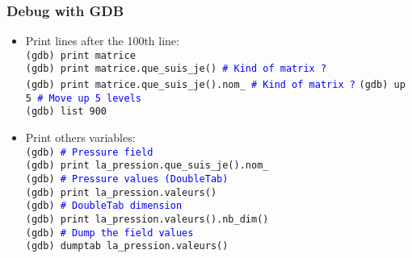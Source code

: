 \documentclass[10pt, hyperref={unicode=true,pdfusetitle, bookmarks=true,bookmarksnumbered=false,bookmarksopen=false, breaklinks=false,pdfborder={0 0 1},backref=true,colorlinks=true,linkcolor=darkblue,pageanchor, urlcolor=darkblue}]{beamer}
\begin{document}
\begin{frame}
\frametitle{Debug with GDB}
\begin{block}{}

\begin{itemize}
\item Print lines after the 100th line:\\
\texttt{(gdb) print matrice}\\
\texttt{(gdb) print matrice.que\_suis\_je() \textcolor{blue}{\# Kind of matrix ?}}\\
\texttt{(gdb) print matrice.que\_suis\_je().nom\_ \textcolor{blue}{\# Kind of matrix ?}}
\texttt{(gdb) up 5 \textcolor{blue}{\# Move up 5 levels}}\\
\texttt{(gdb) list 900}

\item Print others variables:\\
\texttt{(gdb) \textcolor{blue}{\# Pressure field}}\\
\texttt{(gdb) print la\_pression.que\_suis\_je().nom\_}\\
\texttt{(gdb) \textcolor{blue}{\# Pressure values (DoubleTab)}}\\
\texttt{(gdb) print la\_pression.valeurs()}\\
\texttt{(gdb) \textcolor{blue}{\# DoubleTab dimension}}\\
\texttt{(gdb) print la\_pression.valeurs().nb\_dim()}\\
\texttt{(gdb) \textcolor{blue}{\# Dump the field values}}\\
\texttt{(gdb) dumptab la\_pression.valeurs()}
\end{itemize}

\end{block}
\end{frame}
\end{document}
